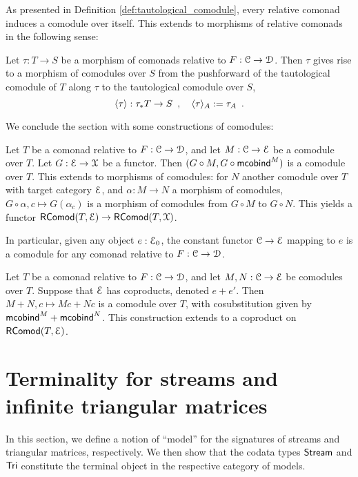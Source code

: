 \documentclass[a4paper,USenglish]{lipics}
\begin{document}
As presented in Definition \ref{def:tautological_comodule}, every relative comonad induces a comodule over itself.
This extends to morphisms of relative comonads in the following sense:

\begin{definition}%
\label{def:induced} 
  Let $\tau : T\to S$ be a morphism of comonads relative to $F : {\mathcal{C}} \to \mathcal{D}$.
  Then $\tau$ gives rise to a morphism of comodules over $S$ from the pushforward of the tautological comodule
  of $T$ along $\tau$ to the tautological comodule over $S$,
  \[ \langle {\tau} \rangle : \tau_*T \to S \enspace , \quad \langle {\tau} \rangle_A := \tau_A \enspace . \]
\end{definition}
% 
We conclude the section with some constructions of comodules:

\begin{lemma}
Let $T$ be a comonad relative to $F : {\mathcal{C}} \to \mathcal{D}$, and let $M : {\mathcal{C}} \to \mathcal{E}$ be a comodule over $T$.
Let $G : \mathcal{E} \to \mathcal{X}$ be a functor.
Then $(G \circ M, G\circ \mathsf{mcobind}^M)$ is a comodule over $T$.
This extends to morphisms of comodules: for $N$ another comodule over $T$ with target category $\mathcal{E}$, and $\alpha : M \to N$ a morphism of comodules,
$G \circ \alpha, c \mapsto G(\alpha_c)$
is a morphism of comodules from $G \circ M$ to $G \circ N$.
This yields a functor
$\mathsf{RComod}(T,\mathcal{E}) \to \mathsf{RComod}(T,\mathcal{X})$. 
\end{lemma}

In particular, given any object $e:\mathcal{E}_0$, the constant functor ${\mathcal{C}}\to\mathcal{E}$ mapping to $e$ is a comodule for any comonad relative to $F:{\mathcal{C}}\to\mathcal{D}$.


\begin{lemma}
Let $T$ be a comonad relative to $F : {\mathcal{C}} \to \mathcal{D}$, and let $M, N: {\mathcal{C}} \to \mathcal{E}$ be comodules over $T$.
Suppose that $\mathcal{E}$ has coproducts, denoted $e + e'$.
Then $M + N, c \mapsto M c + N c$ is a comodule over $T$, with cosubstitution given by $\mathsf{mcobind}^M + \mathsf{mcobind}^N$.
This construction extends to a coproduct on $\mathsf{RComod}(T,\mathcal{E})$. 
\end{lemma}



\section{Terminality for streams and infinite triangular matrices}\label{sec:coalgebras_for_tri}

In this section, we define a notion of \enquote{model} for the signatures of streams and triangular matrices,
respectively. We then show that the codata types $\mathsf{Stream}$ and $\mathsf{Tri}$ constitute the terminal object in
the respective category of models.
\end{document}
